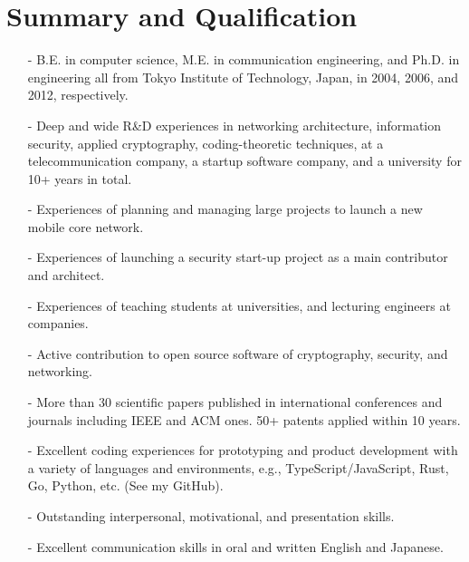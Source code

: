 \section*{Summary and Qualification}
\begin{itemize}
 \item[-] B.E. in computer science, M.E. in communication engineering, and Ph.D. in engineering all from Tokyo Institute of Technology, Japan, in 2004, 2006, and 2012, respectively.
 \item[-] Deep and wide R\&D experiences in networking architecture, information security, applied cryptography, coding-theoretic techniques, at a telecommunication company, a startup software company, and a university for 10+ years in total.
 \item[-] Experiences of planning and managing large projects to launch a new mobile core network.
 \item[-] Experiences of launching a security start-up project as a main contributor and architect.
 \item[-] Experiences of teaching students at universities, and lecturing engineers at companies.
 \item[-] Active contribution to open source software of cryptography, security, and networking.
 \item[-] More than 30 scientific papers published in international conferences and journals including IEEE and ACM ones. 50+ patents applied within 10 years.
 \item[-] Excellent coding experiences for prototyping and product development with a variety of languages and environments, e.g., TypeScript/JavaScript, Rust, Go, Python, etc. (See my GitHub).
 \item[-] Outstanding interpersonal, motivational, and presentation skills.
 \item[-] Excellent communication skills in oral and written English and Japanese.
\end{itemize}
